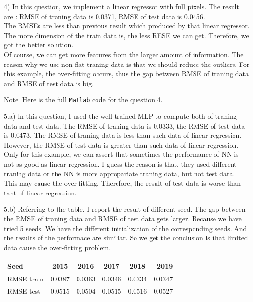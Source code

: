 \documentclass{article}
\begin{document}


4) In this question, we implement a linear regressor with full pixels. The result are :
RMSE of traning data is 0.0371, RMSE of test data is 0.0456. \\
The RMSEs are less than previous result which produced by that linear regressor. The more dimension of the train data is, the 
less RESE we can get. Therefore, we got the better solution.\\
Of course, we can get more features from the larger amount of information. The reason why we use non-flat traning data is that
we should reduce the outliers. For this example, the over-fitting occurs, thus the gap between RMSE of traning data and RMSE of
test data is big.

Note: Here is the full \verb|Matlab| code for the question 4.


5.a) In this question, I used the well trained MLP to compute both of traning data and test data. The RMSE of traning data is 0.0333, 
the RMSE of test data is 0.0473. The RMSE of traning data is less than such data of linear regression. However, the RMSE of test data is 
greater than such data of linear regression. Only for this example, we can assert that sometimes the performance of NN is not as good as 
linear regression. I guess the reason is that, they used different traning data or the NN is more appropariate traning data, but not test data.
This may cause the over-fitting. Therefore, the result of test data is worse than taht of linear regression.



5.b) Referring to the table. I report the result of different seed. The gap between the RMSE of traning data and RMSE of test data gets larger.
Because we have tried 5 seeds. We have the different initialization of the corresponding seeds. And the results of the performace are
similiar. So we get the conclusion is that limited data cause the over-fitting problem.

\begin{center}
  \begin{tabular}{l*{4}{c}r}
    Seed         & 2015 & 2016 & 2017 & 2018 & 2019 \\
    \hline
    RMSE train   & 0.0387 & 0.0363 & 0.0346 & 0.0334 & 0.0347 \\
    RMSE test    & 0.0515 & 0.0504 & 0.0515 & 0.0516 & 0.0527 \\
  \end{tabular}
\end{center}
\end{document}
